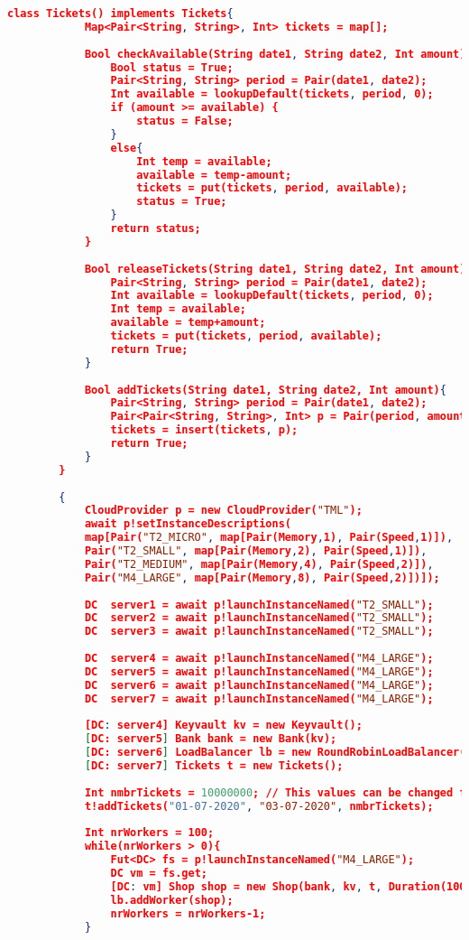 \documentclass[10pt,a4paper,twocolumn]{article}
\begin{document}
\begin{appendices}
\begin{lstlisting}[language=json]
		class Tickets() implements Tickets{
			Map<Pair<String, String>, Int> tickets = map[];
			
			Bool checkAvailable(String date1, String date2, Int amount){
				Bool status = True;
				Pair<String, String> period = Pair(date1, date2);
				Int available = lookupDefault(tickets, period, 0);
				if (amount >= available) {
					status = False;
				}
				else{
					Int temp = available;
					available = temp-amount;
					tickets = put(tickets, period, available);
					status = True;
				}
				return status;
			}
			
			Bool releaseTickets(String date1, String date2, Int amount){
				Pair<String, String> period = Pair(date1, date2);
				Int available = lookupDefault(tickets, period, 0);
				Int temp = available;
				available = temp+amount;
				tickets = put(tickets, period, available);
				return True;
			}
			
			Bool addTickets(String date1, String date2, Int amount){
				Pair<String, String> period = Pair(date1, date2);
				Pair<Pair<String, String>, Int> p = Pair(period, amount);
				tickets = insert(tickets, p);
				return True;
			}
		}
		
		{
			CloudProvider p = new CloudProvider("TML");
			await p!setInstanceDescriptions(
			map[Pair("T2_MICRO", map[Pair(Memory,1), Pair(Speed,1)]),
			Pair("T2_SMALL", map[Pair(Memory,2), Pair(Speed,1)]),
			Pair("T2_MEDIUM", map[Pair(Memory,4), Pair(Speed,2)]),
			Pair("M4_LARGE", map[Pair(Memory,8), Pair(Speed,2)])]);
			
			DC  server1 = await p!launchInstanceNamed("T2_SMALL");
			DC  server2 = await p!launchInstanceNamed("T2_SMALL");
			DC  server3 = await p!launchInstanceNamed("T2_SMALL");
			
			DC  server4 = await p!launchInstanceNamed("M4_LARGE");
			DC  server5 = await p!launchInstanceNamed("M4_LARGE");
			DC  server6 = await p!launchInstanceNamed("M4_LARGE");
			DC  server7 = await p!launchInstanceNamed("M4_LARGE");
			
			[DC: server4] Keyvault kv = new Keyvault();
			[DC: server5] Bank bank = new Bank(kv);
			[DC: server6] LoadBalancer lb = new RoundRobinLoadBalancer();
			[DC: server7] Tickets t = new Tickets();
			
			Int nmbrTickets = 10000000;	// This values can be changed for testing purposes
			t!addTickets("01-07-2020", "03-07-2020", nmbrTickets);
			
			Int nrWorkers = 100;
			while(nrWorkers > 0){
				Fut<DC> fs = p!launchInstanceNamed("M4_LARGE"); 
				DC vm = fs.get;
				[DC: vm] Shop shop = new Shop(bank, kv, t, Duration(1000));
				lb.addWorker(shop); 
				nrWorkers = nrWorkers-1;
			}
			

\end{lstlisting}
\end{appendices}
\end{document}
